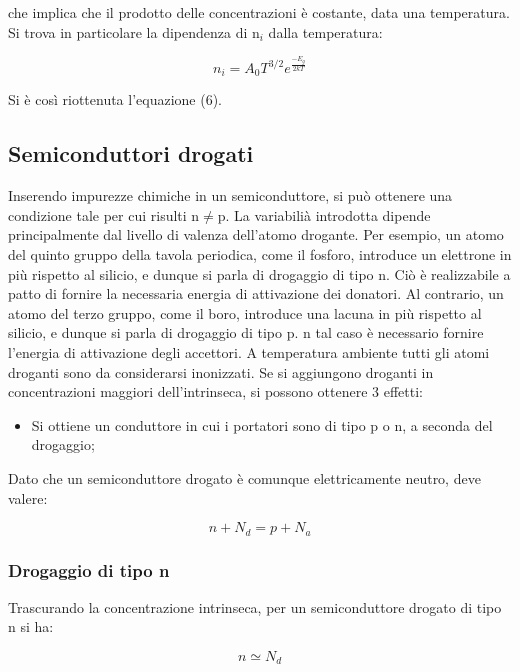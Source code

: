 \documentclass{article}
\begin{document}
che implica che il prodotto delle concentrazioni è costante, data una temperatura.
Si trova in particolare la dipendenza di n$_i$ dalla temperatura:

\begin{equation}
    n_i = A_0 T^{3/2} e^{\frac{-E_g}{2kT}}
\end{equation}

Si è così riottenuta l'equazione (6).

\subsection{Semiconduttori drogati}
Inserendo impurezze chimiche in un semiconduttore, si può ottenere una condizione tale per cui risulti n$\neq$p.
La variabilià introdotta dipende principalmente dal livello di valenza dell'atomo drogante.
Per esempio, un atomo del quinto gruppo della tavola periodica, come il fosforo, introduce un elettrone in più rispetto al silicio, e dunque si parla di drogaggio di tipo n.
Ciò è realizzabile a patto di fornire la necessaria energia di attivazione dei donatori.
Al contrario, un atomo del terzo gruppo, come il boro, introduce una lacuna in più rispetto al silicio, e dunque si parla di drogaggio di tipo p.
n tal caso è necessario fornire l'energia di attivazione degli accettori.
A temperatura ambiente tutti gli atomi droganti sono da considerarsi inonizzati.
Se si aggiungono droganti in concentrazioni maggiori dell'intrinseca, si possono ottenere 3 effetti:

\begin{itemize}
    \item Si ottiene un conduttore in cui i portatori sono di tipo p o n, a seconda del drogaggio;
\end{itemize}

Dato che un semiconduttore drogato è comunque elettricamente neutro, deve valere:

\begin{equation}
    n + N_d = p + N_a
\end{equation}

\subsubsection{Drogaggio di tipo n}

Trascurando la concentrazione intrinseca, per un semiconduttore drogato di tipo n si ha:

\begin{equation}
    n \simeq N_d
\end{equation}
\end{document}
